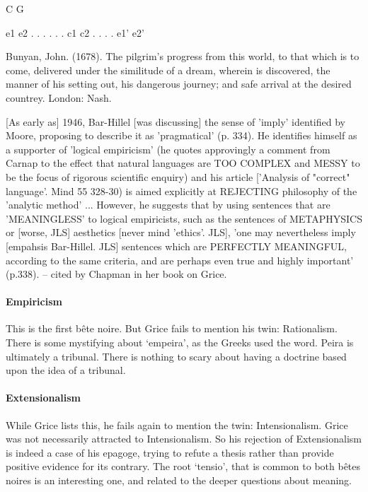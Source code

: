 \documentclass[10pt,titlepage]{book}
\begin{document}
{                    C                   G
 
  e1                                                e2
      .                                           .
        .                                     .
           .                               .
                c1                    c2
                   .                      .
                       .               .
                        e1'   e2'
 
 
Bunyan,  John. (1678). The pilgrim's progress from this world,  to that 
which is to come, delivered under  the similitude of a dream, wherein is 
discovered, the manner of his setting out,  his dangerous journey; and safe 
arrival at the desired countrey. London:  Nash.

[As early as] 1946, Bar-Hillel [was discussing] the sense of 'imply'  
identified by Moore, proposing to describe it as 'pragmatical' (p. 334).  He 
identifies himself as a supporter of 'logical empiricism' (he  quotes 
approvingly a comment from Carnap to the effect that  natural languages are TOO 
COMPLEX and MESSY to be the focus of rigorous  scientific enquiry) and his 
article ['Analysis of "correct"  language'. Mind 55 328-30) is aimed explicitly at 
REJECTING philosophy of  the 'analytic method' ... However, he suggests 
that by using sentences that are  'MEANINGLESS' to logical empiricists, such as 
the sentences of METAPHYSICS or  [worse, JLS] aesthetics [never mind 
'ethics'. JLS], 'one may nevertheless  imply [empahsis Bar-Hillel. JLS] 
sentences which are PERFECTLY MEANINGFUL,  according to the same criteria, and are 
perhaps even true and highly important'  (p.338). -- cited by Chapman in her 
book on Grice.

\paragraph{Empiricism}

This is the first bête noire. But Grice fails to mention his 
twin: Rationalism.  There is some mystifying about ‘empeira’, as the Greeks 
used the word. Peira is  ultimately a tribunal. There is nothing to scary 
about having a doctrine based  upon the idea of a tribunal.  

\paragraph{Extensionalism}

While Grice lists this, he fails again to mention the 
twin: Intensionalism.  Grice was not necessarily attracted to Intensionalism. So 
his rejection of  Extensionalism is indeed a case of his epagoge, trying to 
refute a thesis rather  than provide positive evidence for its contrary. 
The root ‘tensio’, that is  common to both bêtes noires is an interesting 
one, and related to the deeper  questions about meaning. 

}
\end{document}
